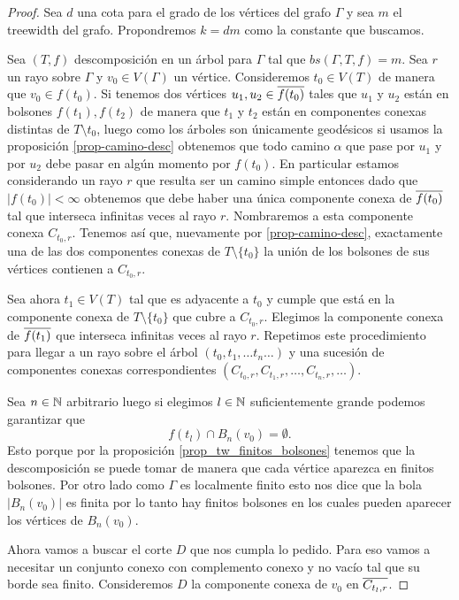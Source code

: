 \documentclass[tesis.tex]{subfiles}
\begin{document}
\begin{proof}
	Sea $d$ una cota para el grado de los vértices del grafo $\Gamma$ y sea $m$ el treewidth del grafo.
	Propondremos $k = dm$ como la constante que buscamos.
	
	Sea $(T,f)$ descomposición en un árbol para $\Gamma$ tal que $bs(\Gamma,T,f) = m$.
	Sea $r$ un rayo sobre $\Gamma$ y $v_{0} \in V(\Gamma)$ un vértice.
	Consideremos $t_0 \in V(T)$ de manera que $v_0 \in f(t_{0})$.
	Si tenemos dos vértices $u_1,u_2 \in \overline{ f(t_{0})}$ tales que $u_1$ y $u_2$ están en bolsones $f(t_{1}), f(t_{2})$ de manera que $t_1$ y $t_2$ están en componentes conexas distintas de $T \setminus t_0$, luego como los árboles son únicamente geodésicos si usamos	la proposición \ref{prop-camino-desc} obtenemos que todo camino $\alpha$ que pase por $u_1$ y por $u_2$ debe pasar en algún momento por $f(t_{0})$.
	En particular estamos considerando un rayo $r$ que resulta ser un camino simple entonces dado que $|f({t_0})| < \infty$ obtenemos que debe haber una única componente conexa de $\overline{f({t_0})}$ tal que interseca infinitas veces al rayo $r$.
	Nombraremos a esta componente conexa $C_{t_0,r}$.
	Tenemos así que, nuevamente por \ref{prop-camino-desc}, exactamente una de las dos componentes conexas de $T \setminus \{t_{0}\}$ la unión de los bolsones de sus vértices contienen a $C_{t_{0},r}$.
	
	Sea ahora $t_{1} \in V(T)$ tal que es adyacente a $t_{0}$ y cumple que está en la componente conexa de $T \setminus \{t_{0}\}$ que cubre a $C_{t_{0},r}$.  
	Elegimos la componente conexa de $\overline{f(t_{1})}$ que interseca infinitas veces al rayo $r$.
	Repetimos este procedimiento para llegar a un rayo sobre el árbol
	$(t_0,t_1, \dots t_n \dots)$ y una sucesión de componentes conexas correspondientes $(C_{t_0,r}, C_{t_1,r}, \dots, C_{t_n, r}, \dots)$.
	
	Sea $n \in \mathbb{N}$ arbitrario luego si elegimos $l \in \mathbb{N}$ suficientemente grande podemos garantizar que
	\[
	f({t_l}) \cap B_n(v_0) = \emptyset.
	\]
	Esto porque por la proposición \ref{prop_tw_finitos_bolsones} tenemos que la descomposición se puede tomar de manera que cada vértice aparezca en finitos bolsones.
	Por otro lado como $\Gamma$ es localmente finito esto nos dice que la bola $|B_n(v_0)|$ es finita por lo tanto hay finitos bolsones en los cuales pueden aparecer los vértices de $B_{n}(v_{0})$.
	
	
	Ahora vamos a buscar el corte $D$ que nos cumpla lo pedido.
	Para eso vamos a necesitar un conjunto conexo con complemento conexo y no vacío tal que su borde sea finito.
	Consideremos $D$ la componente conexa de $v_0$ en $\overline{ C_{t_l, r}}$.
	

\end{proof}
\end{document}

